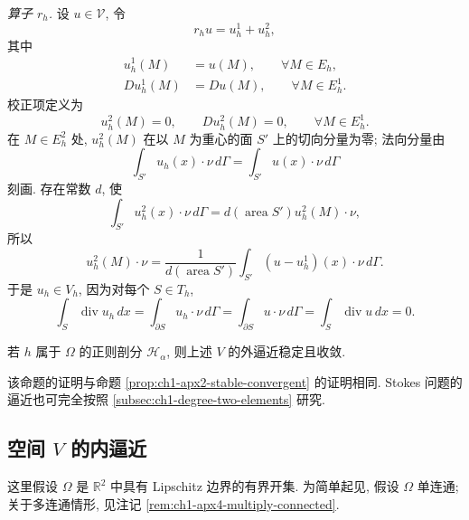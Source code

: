 \emph{算子 $r_h$.} 设 $u\in\mathcal V$, 令
\begin{equation}
r_hu=u_h^1+u_h^2,
\label{eq:ch1-apx3-restriction-split}
\end{equation}
其中
\begin{equation}
\begin{aligned}
u_h^1(M)&=u(M),\qquad\forall M\in E_h,\\
Du_h^1(M)&=Du(M),\qquad\forall M\in E_h^1.
\end{aligned}
\label{eq:ch1-apx3-primary-interpolant}
\end{equation}
校正项定义为
\begin{equation}
u_h^2(M)=0,\qquad Du_h^2(M)=0,
\qquad\forall M\in E_h^1.
\label{eq:ch1-apx3-corrector-vertices}
\end{equation}
在 $M\in E_h^2$ 处, $u_h^2(M)$ 在以 $M$ 为重心的面 $S'$ 上的切向分量为零; 法向分量由
\begin{equation}
\int_{S'}u_h(x)\cdot\nu\,d\Gamma
=\int_{S'}u(x)\cdot\nu\,d\Gamma
\label{eq:ch1-apx3-face-flux}
\end{equation}
刻画. 存在常数 $d$, 使
\[
\int_{S'}u_h^2(x)\cdot\nu\,d\Gamma
=d(\operatorname{area}S')u_h^2(M)\cdot\nu,
\]
所以
\begin{equation}
u_h^2(M)\cdot\nu
=\frac1{d(\operatorname{area}S')}
\int_{S'}(u-u_h^1)(x)\cdot\nu\,d\Gamma.
\label{eq:ch1-apx3-corrector-normal}
\end{equation}
于是 $u_h\in V_h$, 因为对每个 $S\in T_h$,
\[
\int_S\operatorname{div}u_h\,dx
=\int_{\partial S}u_h\cdot\nu\,d\Gamma
=\int_{\partial S}u\cdot\nu\,d\Gamma
=\int_S\operatorname{div}u\,dx=0.
\]

\begin{Proposition}
\label{prop:ch1-apx3-stable-convergent}
若 $h$ 属于 $\Omega$ 的正则剖分 $\mathcal H_\alpha$, 则上述 $V$ 的外逼近稳定且收敛.
\end{Proposition}

该命题的证明与命题 \ref{prop:ch1-apx2-stable-convergent} 的证明相同. Stokes 问题的逼近也可完全按照 \ref{subsec:ch1-degree-two-elements} 研究.

\subsection{空间 \texorpdfstring{$V$}{V} 的内逼近}
\label{subsec:ch1-internal-approximation-v}

这里假设 $\Omega$ 是 $\mathbb R^2$ 中具有 Lipschitz 边界的有界开集. 为简单起见, 假设 $\Omega$ 单连通; 关于多连通情形, 见注记 \ref{rem:ch1-apx4-multiply-connected}.

